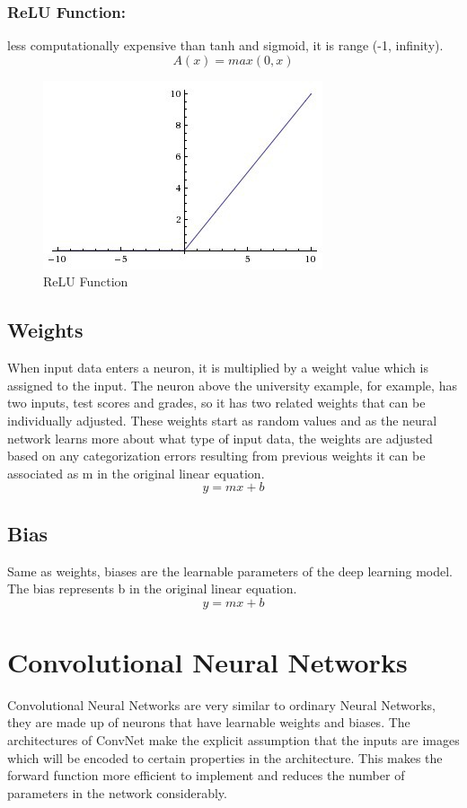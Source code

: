 \documentclass[12pt]{report}
\begin{document}
\subsubsection{ReLU Function:}
less computationally expensive than tanh and sigmoid, it is range (-1, infinity).
$$ A(x) = max(0,x) $$

\begin{figure} [h]
    \centering
    \includegraphics[width=.5\textwidth]{./images/relu.jpeg}
    \caption{ReLU Function}
    \label{fig:relu}
\end{figure}

\subsection{Weights}
When input data enters a neuron, it is multiplied by a weight value which is assigned to the input. The neuron above the university example, 
for example, has two inputs, test scores and grades, so it has two related weights that can be individually adjusted.
These weights start as random values and as the neural network learns more about what type of input data, 
the weights are adjusted based on any categorization errors resulting from previous weights it can be associated as m in the original linear equation.
$$ y = mx + b$$


\subsection{Bias}
Same as weights, biases are the learnable parameters of the deep learning model.
The bias represents b in the original linear equation.
$$ y = mx + b $$

\section{Convolutional Neural Networks}
Convolutional Neural Networks are very similar to ordinary Neural Networks, 
they are made up of neurons that have learnable weights and biases.
The architectures of ConvNet make the explicit assumption that 
the inputs are images which will be encoded to certain properties in the architecture. 
This makes the forward function more efficient to implement and reduces the number of 
parameters in the network considerably.
\end{document}
